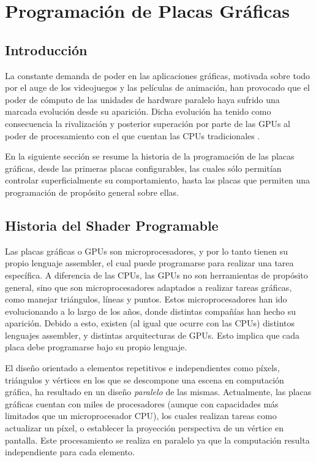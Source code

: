 \chapter{Programación de Placas Gráficas}

\section{Introducci\'on}
La constante demanda de poder en las aplicaciones gr\'aficas, motivada sobre todo por el auge de los videojuegos y las películas de animación, han provocado que el poder de cómputo de las unidades de hardware paralelo haya sufrido una marcada evoluci\'on desde su aparici\'on.
Dicha evoluci\'on ha tenido como consecuencia la rivalizaci\'on y posterior superaci\'on por parte de las GPUs al poder de procesamiento con el que cuentan las CPUs tradicionales \cite{Harris06}.

En la siguiente sección se resume la historia de la programación de las placas gráficas, desde las primeras placas configurables, las cuales sólo permitían controlar superficialmente su comportamiento, hasta las placas que permiten una programación de propósito general sobre ellas.

\section{Historia del Shader Programable}
Las placas gráficas o GPUs son microprocesadores, y por lo tanto tienen su propio lenguaje assembler, el cual puede programarse para realizar una tarea específica.
A diferencia de las CPUs, las GPUs no son herramientas de propósito general, sino que son microprocesadores adaptados a realizar tareas gráficas, como manejar triángulos, líneas y puntos.
Estos microprocesadores han ido evolucionando a lo largo de los años, donde distintas compañías han hecho su aparición.
Debido a esto, existen (al igual que ocurre con las CPUs) distintos lenguajes assembler, y distintas arquitecturas de GPUs.
Esto implica que cada placa debe programarse bajo su propio lenguaje.

El diseño orientado a elementos repetitivos e independientes como píxels, triángulos y vértices en los que se descompone una escena en computación gráfica, ha resultado en un diseño {\em paralelo} de las mismas.
Actualmente, las placas gráficas cuentan con miles de procesadores (aunque con capacidades más limitados que un microprocesador CPU), los cuales realizan tareas como actualizar un píxel, o establecer la proyección perspectiva de un vértice en pantalla.
Este procesamiento se realiza en paralelo ya que la computación resulta independiente para cada elemento.

